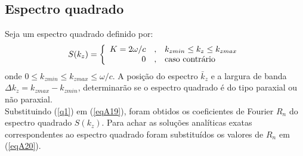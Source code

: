 \subsection{Espectro quadrado} Seja um espectro quadrado definido por:
\begin{equation}\label{q1}
S(k_{z})= \left\{
\begin{array}{rcl}
     K= 2\omega/c & , & k_{zmin}\leq k_{z}\leq k_{zmax}\\
     0 &  , & $caso contr\'ario$
\end{array}
\right.
\end{equation}
onde $0\leq k_{zmin}\leq k_{zmax}  \leq\omega/c$. A posi\c{c}\~ao do espectro $\bar{k}_z$ e a largura de banda $\Delta k_z=k_{zmax}-k_{zmin}$, determinar\~ao se o espectro quadrado \'e do tipo paraxial ou n\~ao paraxial.\\
Substituindo (\ref{q1}) em (\ref{eqA19}), foram obtidos os coeficientes de Fourier $R_n$ do espectro quadrado $S(k_z)$. Para achar as solu\c{c}\~oes anal\'iticas exatas correspondentes ao espectro quadrado foram substitu\'idos os valores de $R_n$ em (\ref{eqA20}).\\
